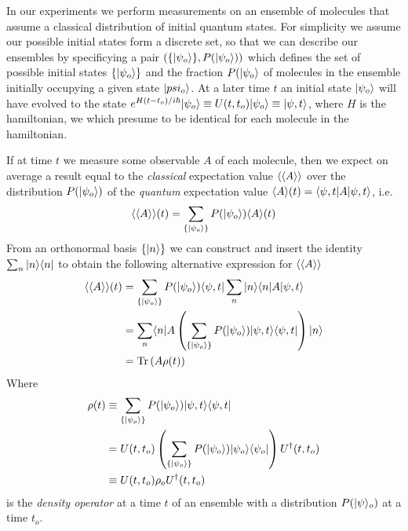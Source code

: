 In our experiments we perform measurements on an ensemble of molecules that assume a classical distribution of initial quantum states. 
For simplicity we assume our possible initial states form a discrete set, so that we can describe our ensembles by specificying a pair 
$\left( \{ | {\psi_o} \rangle \}, P(| {\psi_o} \rangle)\right)$ which defines the set of possible initial states $\{ | {\psi_o} \rangle \}$ and the fraction $P(| {\psi_o} \rangle$ of molecules in the ensemble initially occupying a given state $| {psi_o} \rangle$.
At a later time $t$ an initial state $| {\psi_o} \rangle$ will have evolved to the state $e^{H(t-t_o)/i\hbar}| {\psi_o} \rangle \equiv U(t,t_o) | {\psi_o} \rangle \equiv | {\psi,t} \rangle$, where $H$ is the hamiltonian, we which presume to be identical for each molecule in the hamiltonian.

If at time $t$ we measure some observable $A$ of each molecule, then we expect on average a result equal to the \emph{classical} expectation value $\langle \langle {A} \rangle \rangle$ over the distribution $P(| {\psi_o} \rangle)$ of the \emph{quantum} expectation value $\langle {A} \rangle(t) = \langle {\psi,t} |A | {\psi,t} \rangle$, i.e.
$$
\langle \langle {A} \rangle \rangle (t)= 
\sum_{\{| {\psi_o} \rangle\}} P(| {\psi_o} \rangle) \langle {A} \rangle(t)
$$
From an orthonormal basis $\{ | {n} \rangle \}$ we can construct and insert the identity $\sum_n | {n} \rangle\langle {n} |$ to obtain the following alternative expression for $\langle \langle {A} \rangle \rangle$ 
\begin{equation}
\begin{split}
\langle \langle {A} \rangle \rangle(t)
& = 
\sum_{\{| {\psi_o} \rangle\}} P(| {\psi_o} \rangle) \langle {\psi,t} | \sum_n | {n} \rangle\langle {n} | A | {\psi,t} \rangle
\\ & = 
\sum_n \langle {n} | A \left( \sum_{\{| {\psi_o} \rangle\}} P(| {\psi_o} \rangle) | {\psi,t} \rangle \langle {\psi,t} | \right) | {n} \rangle
\\ & = 
\text{Tr} \left( A \rho(t) \right)
\end{split}
\label{eq:ev}
\end{equation}
Where 
\begin{equation}
\begin{split}
\rho(t) 
& \equiv 
\sum_{\{| {\psi_o} \rangle\}} P(| {\psi_o} \rangle) | {\psi,t} \rangle \langle {\psi,t} | 
\\ & =
U(t,t_o) \left( \sum_{\{| {\psi_o} \rangle\}} P(| {\psi_o} \rangle) | {\psi_o} \rangle \langle {\psi_o} | \right) U^\dagger (t,t_o)
\\ & \equiv
U(t,t_o) \rho_o U^\dagger (t,t_o)
\end{split}
\label{eq:do}
\end{equation}
is the \emph{density operator} at a time $t$ of an ensemble with a distribution $P(| {\psi} \rangle_o)$ at a time $t_o$.

